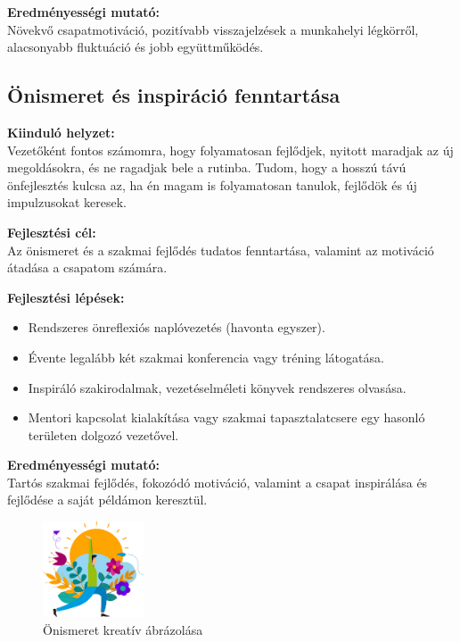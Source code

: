 \textbf{Eredményességi mutató:} \\
Növekvő csapatmotiváció, pozitívabb visszajelzések a munkahelyi légkörről, alacsonyabb fluktuáció és jobb együttműködés.

\subsection{Önismeret és inspiráció fenntartása}

\textbf{Kiinduló helyzet:} \\
Vezetőként fontos számomra, hogy folyamatosan fejlődjek, nyitott maradjak az új megoldásokra, és ne ragadjak bele a rutinba.
Tudom, hogy a hosszú távú önfejlesztés kulcsa az, ha én magam is folyamatosan tanulok, 
fejlődök és új impulzusokat keresek.

\textbf{Fejlesztési cél:} \\
Az önismeret és a szakmai fejlődés tudatos fenntartása, valamint az motiváció átadása a csapatom számára.

\textbf{Fejlesztési lépések:}
\begin{itemize}
    \item Rendszeres önreflexiós naplóvezetés (havonta egyszer).
    \item Évente legalább két szakmai konferencia vagy tréning látogatása.
    \item Inspiráló szakirodalmak, vezetéselméleti könyvek rendszeres olvasása.
    \item Mentori kapcsolat kialakítása vagy szakmai tapasztalatcsere egy hasonló területen dolgozó vezetővel.
\end{itemize}

\textbf{Eredményességi mutató:} \\
Tartós szakmai fejlődés, fokozódó motiváció, valamint a csapat inspirálása és fejlődése a saját példámon keresztül.
\begin{figure}[H]
	\centering
    \includegraphics[width=30mm, keepaspectratio]{figures/self_knowledge.jpg}
    \caption{Önismeret kreatív ábrázolása}
    \label {fig:self_knowledge}
\end{figure}
